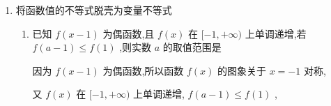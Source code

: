 \begin{enumerate}
\begin{enumerate}
\begin{jieda}
        所以 $f\left( x\right)$ 在 $\left( {0, + \infty }\right)$ 上也是单调递减,且 $f\left( {-3}\right)  = 0,f\left( 0\right)  = 0$ ,
        
        所以当 $x \in  \left( {-\infty , - 3}\right)  \cup  \left( {0,3}\right)$ 时, $f\left( x\right)  > 0$ ,当 $x \in  \left( {-3,0}\right)  \cup  \left( {3, + \infty }\right)$ 时, $f\left( x\right)  < 0$ ,
        
        所以由 $\left( {x + 1}\right) f\left( x\right)  \geq  0$ ,可得: $\left\{  \begin{array}{l} x + 1 \leq  0 \\  f\left( x\right)  \leq  0 \end{array}\right.$ ,或 $\left\{  \begin{array}{l} x + 1 \geq  0 \\  f\left( x\right)  \geq  0 \end{array}\right.$ ,或 $x = 0$ ,
        
        解得 $0 \leq  x \leq  3$ 或 $- 3 \leq  x \leq   - 1$ ,
        
        所以满足 $\left( {x + 1}\right) f\left( x\right)  \geq  0$ 的 $x$ 的取值范围是 $\left\lbrack  {-3, - 1}\right\rbrack   \cup  \left\lbrack  {0,3}\right\rbrack$ 
    \end{jieda}
\end{enumerate}
\item 将函数值的不等式脱壳为变量不等式
\begin{enumerate}
    \item 已知 $f\left( {x - 1}\right)$ 为偶函数,且 $f\left( x\right)$ 在 $\lbrack  - 1, + \infty )$ 上单调递增,若 $f\left( {a - 1}\right)  \leq  f\left( 1\right)$ ,则实数 $a$ 的取值范围是\blkda{$[-2, 2]$}
    \begin{jieda}
        因为 $f\left( {x - 1}\right)$ 为偶函数,所以函数 $f\left( x\right)$ 的图象关于 $x =  - 1$ 对称,
        
        又 $f\left( x\right)$ 在 $\lbrack  - 1, + \infty )$ 上单调递增, $f\left( {a - 1}\right)  \leq  f\left( 1\right)$ ,
        

\end{jieda}
\end{enumerate}
\end{enumerate}
